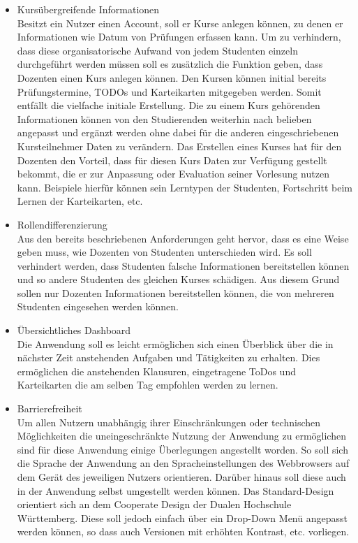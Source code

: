 \begin{itemize}
    \item Kursübergreifende Informationen   \\
        Besitzt ein Nutzer einen Account, soll er Kurse anlegen können, zu denen er Informationen wie Datum von Prüfungen erfassen kann.
        Um zu verhindern, dass diese organisatorische Aufwand von jedem Studenten einzeln durchgeführt werden müssen soll es zusätzlich die Funktion geben, dass Dozenten einen Kurs anlegen können.
        Den Kursen können initial bereits Prüfungstermine, TODOs und Karteikarten mitgegeben werden.
        Somit entfällt die vielfache initiale Erstellung.
        Die zu einem Kurs gehörenden Informationen können von den Studierenden weiterhin nach belieben angepasst und ergänzt werden ohne dabei für die anderen eingeschriebenen Kursteilnehmer Daten zu verändern.
        Das Erstellen eines Kurses hat für den Dozenten den Vorteil, dass für diesen Kurs Daten zur Verfügung gestellt bekommt, die er zur Anpassung oder Evaluation seiner Vorlesung nutzen kann.
        Beispiele hierfür können sein Lerntypen der Studenten, Fortschritt beim Lernen der Karteikarten, etc.
    \item Rollendifferenzierung             \\
        Aus den bereits beschriebenen Anforderungen geht hervor, dass es eine Weise geben muss, wie Dozenten von Studenten unterschieden wird.
        Es soll verhindert werden, dass Studenten falsche Informationen bereitstellen können und so andere Studenten des gleichen Kurses schädigen.
        Aus diesem Grund sollen nur Dozenten Informationen bereitstellen können, die von mehreren Studenten eingesehen werden können.
    \item Übersichtliches Dashboard			\\
   		Die Anwendung soll es leicht ermöglichen sich einen Überblick über die in nächster Zeit anstehenden Aufgaben und Tätigkeiten zu erhalten. Dies ermöglichen die anstehenden Klausuren, eingetragene ToDos und Karteikarten die am selben Tag empfohlen werden zu lernen.
   	\item Barrierefreiheit		\\
   		Um allen Nutzern unabhängig ihrer Einschränkungen oder technischen Möglichkeiten die uneingeschränkte Nutzung der Anwendung zu ermöglichen sind für diese Anwendung einige Überlegungen angestellt worden. So soll sich die Sprache der Anwendung an den Spracheinstellungen des Webbrowsers auf dem Gerät des jeweiligen Nutzers orientieren. Darüber hinaus soll diese auch in der Anwendung selbst umgestellt werden können. Das Standard-Design orientiert sich an dem Cooperate Design der Dualen Hochschule Württemberg. Diese soll jedoch einfach über ein Drop-Down Menü angepasst werden können, so dass auch Versionen mit erhöhten Kontrast, etc. vorliegen.  
\end{itemize}

